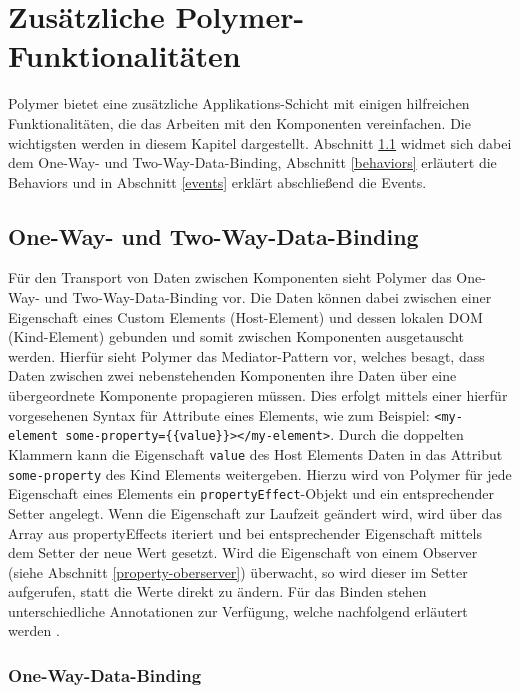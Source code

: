 \chapter{Zusätzliche Polymer-Funktionalitäten}\label{zusaetzliche-polymer-funktionalitaeten}

Polymer bietet eine zusätzliche Applikations-Schicht mit einigen hilfreichen Funktionalitäten, die das Arbeiten mit den Komponenten vereinfachen. Die wichtigsten werden in diesem Kapitel dargestellt. Abschnitt \ref{one-way--und-two-way-data-binding} widmet sich dabei dem One-Way- und Two-Way-Data-Binding, Abschnitt \ref{behaviors} erläutert die Behaviors und in Abschnitt \ref{events} erklärt abschließend die Events.


\section{One-Way- und Two-Way-Data-Binding}\label{one-way--und-two-way-data-binding}

Für den Transport von Daten zwischen Komponenten sieht Polymer das One-Way- und Two-Way-Data-Binding vor. Die Daten können dabei zwischen einer Eigenschaft eines Custom Elements (Host-Element) und dessen lokalen \ac{DOM} (Kind-Element) gebunden und somit zwischen Komponenten ausgetauscht werden. Hierfür sieht Polymer das Mediator-Pattern vor, welches besagt, dass Daten zwischen zwei nebenstehenden Komponenten ihre Daten über eine übergeordnete Komponente propagieren müssen. Dies erfolgt mittels einer hierfür vorgesehenen Syntax für Attribute eines Elements, wie zum Beispiel: \texttt{\textless{}my-element\ some-property=\{\{value\}\}\textgreater{}\textless{}/my-element\textgreater{}}. Durch die doppelten Klammern kann die Eigenschaft \texttt{value} des Host Elements Daten in das Attribut \texttt{some-property} des Kind Elements weitergeben. Hierzu wird von Polymer für jede Eigenschaft eines Elements ein \texttt{propertyEffect}-Objekt und ein entsprechender Setter angelegt. Wenn die Eigenschaft zur Laufzeit geändert wird, wird über das Array aus propertyEffects iteriert und bei entsprechender Eigenschaft mittels dem Setter der neue Wert gesetzt. Wird die Eigenschaft von einem Observer (siehe Abschnitt \ref{property-oberserver}) überwacht, so wird dieser im Setter aufgerufen, statt die Werte direkt zu ändern. Für das Binden stehen unterschiedliche Annotationen zur Verfügung, welche nachfolgend erläutert werden \cite{citeulike:13914892}.


\subsection{One-Way-Data-Binding}\label{one-way-data-binding}

